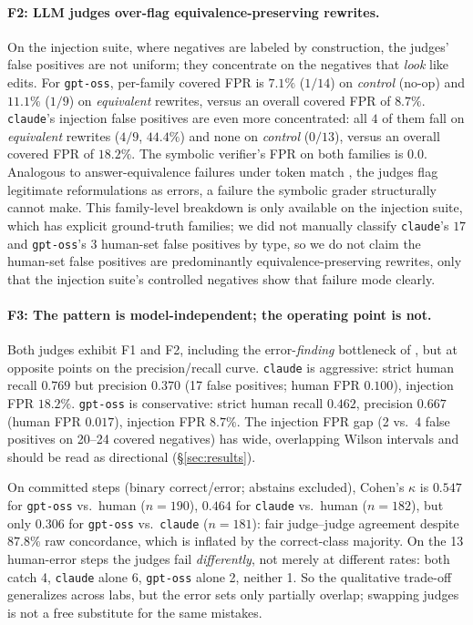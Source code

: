 \paragraph{F2: LLM judges over-flag equivalence-preserving rewrites.}
On the injection suite, where negatives are labeled by construction, the
judges' false positives are not uniform; they concentrate on the negatives
that \emph{look} like edits. For \texttt{gpt-oss}, per-family covered FPR is
$7.1\%$ ($1/14$) on \emph{control} (no-op) and $11.1\%$ ($1/9$) on
\emph{equivalent} rewrites, versus an overall covered FPR of $8.7\%$.
\texttt{claude}'s injection false positives are even more concentrated: all
$4$ of them fall on \emph{equivalent} rewrites ($4/9$, $44.4\%$) and none on
\emph{control} ($0/13$), versus an overall covered FPR of $18.2\%$. The
symbolic verifier's FPR on both families is $0.0$. Analogous to
answer-equivalence failures under token match \citep{bulian2022tomayto}, the
judges flag legitimate reformulations as errors, a failure the symbolic
grader structurally cannot make. This family-level breakdown is only
available on the injection suite, which has explicit ground-truth families;
we did not manually classify \texttt{claude}'s $17$ and \texttt{gpt-oss}'s
$3$ human-set false positives by type, so we do not claim the human-set false
positives are predominantly equivalence-preserving rewrites, only that the
injection suite's controlled negatives show that failure mode clearly.

\paragraph{F3: The pattern is model-independent; the operating point is not.}
Both judges exhibit F1 and F2, including the error-\emph{finding} bottleneck
of \citet{tyen2024errors}, but at opposite points on the precision/recall
curve. \texttt{claude} is aggressive: strict human recall $0.769$ but precision
$0.370$ (17 false positives; human FPR $0.100$), injection FPR $18.2\%$.
\texttt{gpt-oss} is conservative: strict human recall $0.462$, precision
$0.667$ (human FPR $0.017$), injection FPR $8.7\%$. The injection FPR gap
(2 vs.\ 4 false positives on 20--24 covered negatives) has wide, overlapping
Wilson intervals and should be read as directional (\S\ref{sec:results}).

On committed steps (binary
correct/error; abstains excluded), Cohen's $\kappa$ is $0.547$ for
\texttt{gpt-oss} vs.\ human ($n{=}190$), $0.464$ for \texttt{claude} vs.\ human
($n{=}182$), but only $0.306$ for \texttt{gpt-oss} vs.\ \texttt{claude}
($n{=}181$): fair judge--judge agreement despite $87.8\%$ raw concordance,
which is inflated by the correct-class majority. On the 13 human-error steps the
judges fail \emph{differently}, not merely at different rates: both catch 4,
\texttt{claude} alone 6, \texttt{gpt-oss} alone 2, neither 1. So the qualitative
trade-off generalizes across labs, but the error sets only partially overlap;
swapping judges is not a free substitute for the same mistakes.

